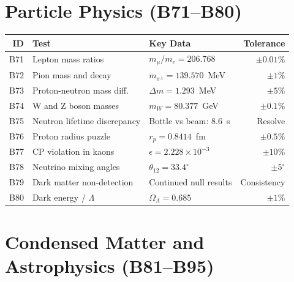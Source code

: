 \documentclass[12pt,a4paper]{report}
\begin{document}
\section{Particle Physics (B71--B80)}

\begin{center}
\small
\begin{tabular}{rllr}
\toprule
\textbf{ID} & \textbf{Test} & \textbf{Key Data} & \textbf{Tolerance} \\
\midrule
B71 & Lepton mass ratios & $m_\mu/m_e = 206.768$ & $\pm 0.01\%$ \\
B72 & Pion mass and decay & $m_{\pi^\pm} = 139.570$~MeV & $\pm 1\%$ \\
B73 & Proton-neutron mass diff. & $\Delta m = 1.293$~MeV & $\pm 5\%$ \\
B74 & W and Z boson masses & $m_W = 80.377$~GeV & $\pm 0.1\%$ \\
B75 & Neutron lifetime discrepancy & Bottle vs beam: 8.6~s & Resolve \\
B76 & Proton radius puzzle & $r_p = 0.8414$~fm & $\pm 0.5\%$ \\
B77 & CP violation in kaons & $\epsilon = 2.228 \times 10^{-3}$ & $\pm 10\%$ \\
B78 & Neutrino mixing angles & $\theta_{12} = 33.4^\circ$ & $\pm 5^\circ$ \\
B79 & Dark matter non-detection & Continued null results & Consistency \\
B80 & Dark energy / $\Lambda$ & $\Omega_\Lambda = 0.685$ & $\pm 1\%$ \\
\bottomrule
\end{tabular}
\end{center}

\section{Condensed Matter and Astrophysics (B81--B95)}
\end{document}
